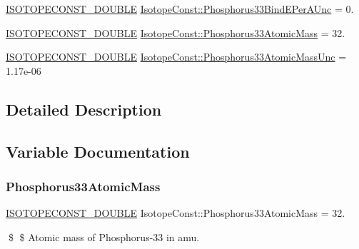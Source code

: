 \begin{DoxyCompactItemize}
\mbox{\hyperlink{group___isotope_const-_macros_ga8f45a7272ce02c0b4c65c44636ed719a}{I\+S\+O\+T\+O\+P\+E\+C\+O\+N\+S\+T\+\_\+\+D\+O\+U\+B\+LE}} \mbox{\hyperlink{group___isotope_const-_phosphorus-_p33_ga7f18d0933d3b333a6591c5cac58f7f4c}{Isotope\+Const\+::\+Phosphorus33\+Bind\+E\+Per\+A\+Unc}} = 0.
\item 
\mbox{\hyperlink{group___isotope_const-_macros_ga8f45a7272ce02c0b4c65c44636ed719a}{I\+S\+O\+T\+O\+P\+E\+C\+O\+N\+S\+T\+\_\+\+D\+O\+U\+B\+LE}} \mbox{\hyperlink{group___isotope_const-_phosphorus-_p33_ga312dee48bd8595dfd9d7533947de379f}{Isotope\+Const\+::\+Phosphorus33\+Atomic\+Mass}} = 32.
\item 
\mbox{\hyperlink{group___isotope_const-_macros_ga8f45a7272ce02c0b4c65c44636ed719a}{I\+S\+O\+T\+O\+P\+E\+C\+O\+N\+S\+T\+\_\+\+D\+O\+U\+B\+LE}} \mbox{\hyperlink{group___isotope_const-_phosphorus-_p33_ga92fcea40fcbdba56db273118f1912a1f}{Isotope\+Const\+::\+Phosphorus33\+Atomic\+Mass\+Unc}} = 1.\+17e-\/06
\end{DoxyCompactItemize}


\subsection{Detailed Description}


\subsection{Variable Documentation}
\mbox{\label{group___isotope_const-_phosphorus-_p33_ga312dee48bd8595dfd9d7533947de379f}} 
\subsubsection{\texorpdfstring{Phosphorus33\+Atomic\+Mass}{Phosphorus33AtomicMass}}
{\footnotesize\ttfamily \mbox{\hyperlink{group___isotope_const-_macros_ga8f45a7272ce02c0b4c65c44636ed719a}{I\+S\+O\+T\+O\+P\+E\+C\+O\+N\+S\+T\+\_\+\+D\+O\+U\+B\+LE}} Isotope\+Const\+::\+Phosphorus33\+Atomic\+Mass = 32.}

\$ \$ Atomic mass of Phosphorus-\/33 in amu. \mbox{\label{group___isotope_const-_phosphorus-_p33_ga92fcea40fcbdba56db273118f1912a1f}} 
